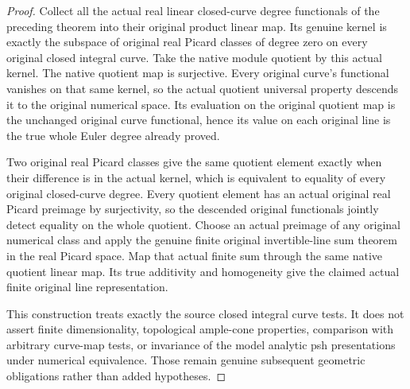 \begin{proof}
Collect all the actual real linear closed-curve degree functionals
of the preceding theorem into their original product linear map.
Its genuine kernel is exactly the subspace of original real
Picard classes of degree zero on every original closed integral
curve. Take the native module quotient by this actual kernel.
The native quotient map is surjective. Every original curve's
functional vanishes on that same kernel, so the actual quotient
universal property descends it to the original numerical space.
Its evaluation on the original quotient map is the unchanged
original curve functional, hence its value on each original line
is the true whole Euler degree already proved.

Two original real Picard classes give the same quotient element
exactly when their difference is in the actual kernel, which
is equivalent to equality of every original closed-curve degree.
Every quotient element has an actual original real Picard
preimage by surjectivity, so the descended original functionals
jointly detect equality on the whole quotient. Choose an actual
preimage of any original numerical class and apply the genuine
finite original invertible-line sum theorem in the real Picard
space. Map that actual finite sum through the same native
quotient linear map. Its true additivity and homogeneity give
the claimed actual finite original line representation.

This construction treats exactly the source closed integral
curve tests. It does not assert finite dimensionality,
topological ample-cone properties, comparison with arbitrary
curve-map tests, or invariance of the model analytic psh
presentations under numerical equivalence. Those remain genuine
subsequent geometric obligations rather than added hypotheses.
\end{proof}
